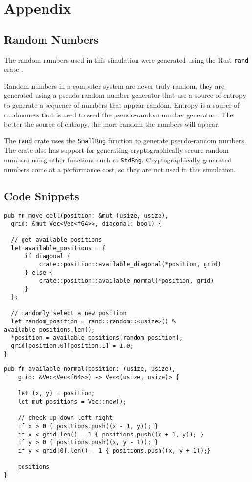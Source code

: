 \chapter{Appendix}

\section{Random Numbers} \label{sec:random}

The random numbers used in this simulation were generated using the Rust \verb|rand| crate \autocite{rustRustrandomRand2024}.

Random numbers in a computer system are never truly random, they are generated using a pseudo-random number generator that use a source of entropy to generate a sequence of numbers that appear random.
Entropy is a source of randomness that is used to seed the pseudo-random number generator \autocite{mertensEntropyPseudorandomnumberGenerators2004}.
The better the source of entropy, the more random the numbers will appear.

The \verb|rand| crate uses the \verb|SmallRng| function to generate pseudo-random numbers.
The crate also has support for generating cryptographically secure random numbers using other functions such as \verb|StdRng|.
Cryptographically generated numbers come at a performance cost, so they are not used in this simulation.


\section{Code Snippets} \label{sec:code}

\begin{lstlisting}[caption=Move Cell (Rust), label={lst:moveCell},captionpos=b]
pub fn move_cell(position: &mut (usize, usize), 
  grid: &mut Vec<Vec<f64>>, diagonal: bool) {

  // get available positions
  let available_positions = {
      if diagonal {
          crate::position::available_diagonal(*position, grid)
      } else {
          crate::position::available_normal(*position, grid)
      }
  };

  // randomly select a new position
  let random_position = rand::random::<usize>() % available_positions.len();
  *position = available_positions[random_position];
  grid[position.0][position.1] = 1.0;
}
\end{lstlisting}

\clearpage

\begin{lstlisting}[caption=Available Normal (Rust), label={lst:availableNormal},captionpos=b]
  pub fn available_normal(position: (usize, usize),
    grid: &Vec<Vec<f64>>) -> Vec<(usize, usize)> {

    let (x, y) = position;
    let mut positions = Vec::new();

    // check up down left right
    if x > 0 { positions.push((x - 1, y)); }
    if x < grid.len() - 1 { positions.push((x + 1, y)); }
    if y > 0 { positions.push((x, y - 1)); }
    if y < grid[0].len() - 1 { positions.push((x, y + 1));}

    positions
}
\end{lstlisting}


